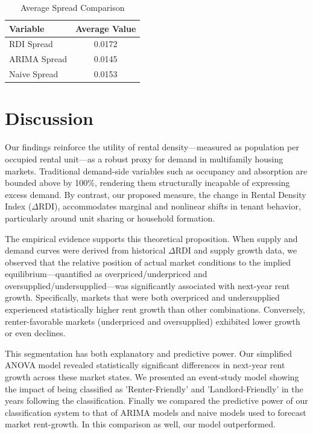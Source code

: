\documentclass[APA,Times1COL]{WileyNJDv5} %
\begin{document}
\begin{table}[ht]
	\centering
	\caption{Average Spread Comparison}
	\label{tab:average_spread}
	\begin{tabular}{lc}
		\toprule
		Variable & Average Value \\
		\midrule
		
		RDI Spread & 0.0172 \\
		ARIMA Spread & 0.0145 \\
		Naive Spread & 0.0153 \\
		\bottomrule
	\end{tabular}
\end{table}



\section{Discussion}

Our findings reinforce the utility of rental density---measured as population per occupied rental unit---as a robust proxy for demand in multifamily housing markets. Traditional demand-side variables such as occupancy and absorption are bounded above by 100\%, rendering them structurally incapable of expressing excess demand. By contrast, our proposed measure, the change in Rental Density Index (\(\Delta\text{RDI}\)), accommodates marginal and nonlinear shifts in tenant behavior, particularly around unit sharing or household formation.

The empirical evidence supports this theoretical proposition. When supply and demand curves were derived from historical \(\Delta\text{RDI}\) and supply growth data, we observed that the relative position of actual market conditions to the implied equilibrium---quantified as overpriced/underpriced and oversupplied/undersupplied---was significantly associated with next-year rent growth. Specifically, markets that were both overpriced and undersupplied experienced statistically higher rent growth than other combinations. Conversely, renter-favorable markets (underpriced and oversupplied) exhibited lower growth or even declines. 

This segmentation has both explanatory and predictive power. Our simplified ANOVA model revealed statistically significant differences in next-year rent growth across these market states. We presented an event-study model showing the impact of being classified as 'Renter-Friendly' and 'Landlord-Friendly' in the years following the classification. Finally we compared the predictive power of our classification system to that of ARIMA models and naive models used to forecast market rent-growth. In this comparison as well, our model outperformed. 
\end{document}
